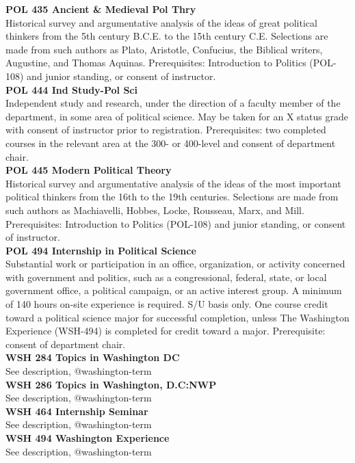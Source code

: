 \documentclass[
  letterpaper,
]{scrbook}
\begin{document}
\textbf{POL 435 Ancient \& Medieval Pol Thry}\\
Historical survey and argumentative analysis of the ideas of great
political thinkers from the 5th century B.C.E. to the 15th century C.E.
Selections are made from such authors as Plato, Aristotle, Confucius,
the Biblical writers, Augustine, and Thomas Aquinas. Prerequisites:
Introduction to Politics (POL-108) and junior standing, or consent of
instructor.\\
\textbf{POL 444 Ind Study-Pol Sci}\\
Independent study and research, under the direction of a faculty member
of the department, in some area of political science. May be taken for
an X status grade with consent of instructor prior to registration.
Prerequisites: two completed courses in the relevant area at the 300- or
400-level and consent of department chair.\\
\textbf{POL 445 Modern Political Theory}\\
Historical survey and argumentative analysis of the ideas of the most
important political thinkers from the 16th to the 19th centuries.
Selections are made from such authors as Machiavelli, Hobbes, Locke,
Rousseau, Marx, and Mill. Prerequisites: Introduction to Politics
(POL-108) and junior standing, or consent of instructor.\\
\textbf{POL 494 Internship in Political Science}\\
Substantial work or participation in an office, organization, or
activity concerned with government and politics, such as a
congressional, federal, state, or local government office, a political
campaign, or an active interest group. A minimum of 140 hours on-site
experience is required. S/U basis only. One course credit toward a
political science major for successful completion, unless The Washington
Experience (WSH-494) is completed for credit toward a major.
Prerequisite: consent of department chair.\\
\textbf{WSH 284 Topics in Washington DC}\\
See description, @washington-term\\
\textbf{WSH 286 Topics in Washington, D.C:NWP}\\
See description, @washington-term\\
\textbf{WSH 464 Internship Seminar}\\
See description, @washington-term\\
\textbf{WSH 494 Washington Experience}\\
See description, @washington-term
\end{document}

